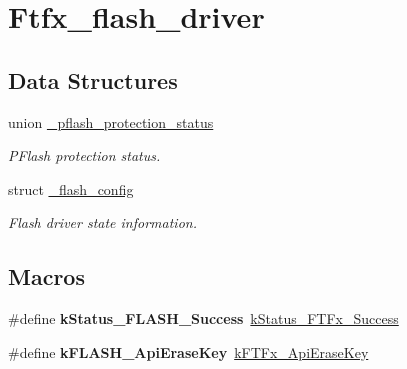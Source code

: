\hypertarget{group__ftfx__flash__driver}{}\section{Ftfx\+\_\+flash\+\_\+driver}
\label{group__ftfx__flash__driver}
\subsection*{Data Structures}
\begin{DoxyCompactItemize}
\item 
union \mbox{\hyperlink{union__pflash__protection__status}{\+\_\+pflash\+\_\+protection\+\_\+status}}
\begin{DoxyCompactList}\small\item\em P\+Flash protection status. \end{DoxyCompactList}\item 
struct \mbox{\hyperlink{struct__flash__config}{\+\_\+flash\+\_\+config}}
\begin{DoxyCompactList}\small\item\em Flash driver state information. \end{DoxyCompactList}\end{DoxyCompactItemize}
\subsection*{Macros}
\begin{DoxyCompactItemize}
\item 
\mbox{\label{group__ftfx__flash__driver_ga4b588c362a06ff851d3765f9db6d306d}} 
\#define {\bfseries k\+Status\+\_\+\+F\+L\+A\+S\+H\+\_\+\+Success}~\mbox{\hyperlink{group__ftfx__controller_gga458e651af6690959efa2afb96be7d609a8825e5cb3b30edfd6a26897eef4c66a3}{k\+Status\+\_\+\+F\+T\+Fx\+\_\+\+Success}}
\item 
\mbox{\label{group__ftfx__flash__driver_ga9e0950e0824495790084ea3e623814fc}} 
\#define {\bfseries k\+F\+L\+A\+S\+H\+\_\+\+Api\+Erase\+Key}~\mbox{\hyperlink{group__ftfx__controller_ggaaed04d931a32adf243a57f5e6d56da2da14949b7fee40a9d02fac191828f5f899}{k\+F\+T\+Fx\+\_\+\+Api\+Erase\+Key}}
\end{DoxyCompactItemize}
